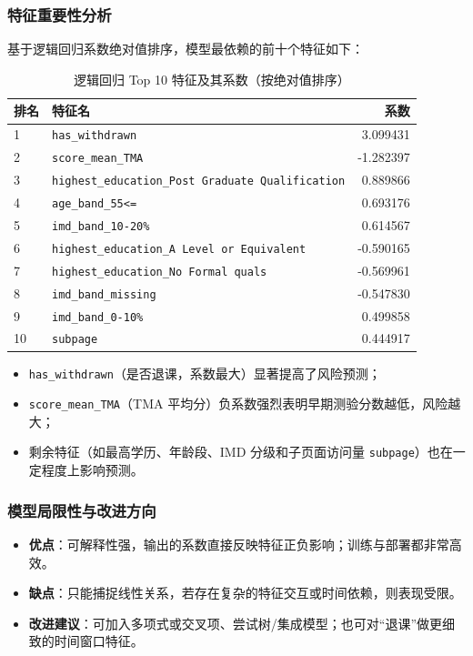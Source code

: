 \documentclass{SYSUReport}
\begin{document}
\subsubsection{特征重要性分析}
基于逻辑回归系数绝对值排序，模型最依赖的前十个特征如下：

\begin{table}[htbp]
\centering
\begin{tabular}{lp{6cm}r}
\hline
排名 & 特征名 & 系数 \\
\hline
1 & \texttt{has\_withdrawn}                                &  3.099431 \\
2 & \texttt{score\_mean\_TMA}                              & -1.282397 \\
3 & \texttt{highest\_education\_Post Graduate Qualification} &  0.889866 \\
4 & \texttt{age\_band\_55<=}                                &  0.693176 \\
5 & \texttt{imd\_band\_10-20\%}                             &  0.614567 \\
6 & \texttt{highest\_education\_A Level or Equivalent}      & -0.590165 \\
7 & \texttt{highest\_education\_No Formal quals}            & -0.569961 \\
8 & \texttt{imd\_band\_missing}                             & -0.547830 \\
9 & \texttt{imd\_band\_0-10\%}                              &  0.499858 \\
10 & \texttt{subpage}                                       &  0.444917 \\
\hline
\end{tabular}
\caption{逻辑回归 Top 10 特征及其系数（按绝对值排序）}
\end{table}

\begin{itemize}
  \item \texttt{has\_withdrawn}（是否退课，系数最大）显著提高了风险预测；  
  \item \texttt{score\_mean\_TMA}（TMA 平均分）负系数强烈表明早期测验分数越低，风险越大；  
  \item 剩余特征（如最高学历、年龄段、IMD 分级和子页面访问量 \texttt{subpage}）也在一定程度上影响预测。
\end{itemize}

\subsubsection{模型局限性与改进方向}
\begin{itemize}
  \item \textbf{优点}：可解释性强，输出的系数直接反映特征正负影响；训练与部署都非常高效。  
  \item \textbf{缺点}：只能捕捉线性关系，若存在复杂的特征交互或时间依赖，则表现受限。  
  \item \textbf{改进建议}：可加入多项式或交叉项、尝试树/集成模型；也可对“退课”做更细致的时间窗口特征。  
\end{itemize}
\end{document}
